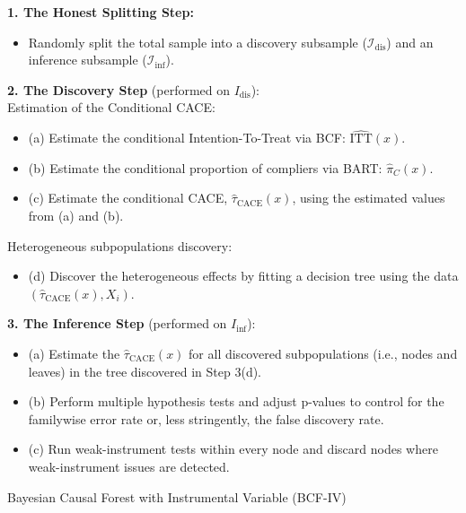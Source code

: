 \begin{algorithm}[H]
    \footnotesize
    \DontPrintSemicolon
    \SetAlgoLined
    \LinesNotNumbered
    \BlankLine
    \textbf{1. The Honest Splitting Step:} \\
    \begin{itemize}
        \item Randomly split the total sample into a discovery subsample ($\mathcal{I}_{\text{dis}}$) and an inference subsample ($\mathcal{I}_{\text{inf}}$).
    \end{itemize}
    \BlankLine
    \textbf{2. The Discovery Step} (performed on $I_{\text{dis}}$): \\
    Estimation of the Conditional CACE:
    \begin{itemize}
        \item (a) Estimate the conditional Intention-To-Treat via BCF: $\widehat{\text{ITT}}(x)$.
        \item (b) Estimate the conditional proportion of compliers via BART: $\widehat{\pi}_C(x)$.
        \item (c) Estimate the conditional CACE, $\widehat{\tau}_{\text{CACE}}(x)$, using the estimated values from (a) and (b).
    \end{itemize}
    Heterogeneous subpopulations discovery:
    \begin{itemize}
        \item (d) Discover the heterogeneous effects by fitting a decision tree using the data $(\widehat{\tau}_{\text{CACE}}(x), X_i)$.
    \end{itemize}
    \BlankLine
    \textbf{3. The Inference Step} (performed on $I_{\text{inf}}$): \\
    \begin{itemize}
        \item (a) Estimate the $\widehat{\tau}_{\text{CACE}}(x)$ for all discovered subpopulations (i.e., nodes and leaves) in the tree discovered in Step 3(d).
        \item (b) Perform multiple hypothesis tests and adjust p-values to control for the familywise error rate or, less stringently, the false discovery rate. 
        \item (c) Run weak-instrument tests within every node and discard nodes where weak-instrument issues are detected.
    \end{itemize}
    \caption{Bayesian Causal Forest with Instrumental Variable (BCF-IV)}
    \label{algo:BCF-IV}
\end{algorithm}


